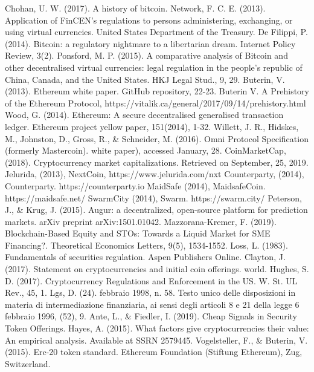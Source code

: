 \begin{thebibliography}{90}
 Chohan, U. W. (2017). A history of bitcoin.
 Network, F. C. E. (2013). Application of FinCEN’s regulations to persons administering, exchanging, or using virtual currencies. United States Department of the Treasury.
 De Filippi, P. (2014). Bitcoin: a regulatory nightmare to a libertarian dream. Internet Policy Review, 3(2).
 Ponsford, M. P. (2015). A comparative analysis of Bitcoin and other decentralised virtual currencies: legal regulation in the people's republic of China, Canada, and the United States. HKJ Legal Stud., 9, 29.
 Buterin, V. (2013). Ethereum white paper. GitHub repository, 22-23.
 Buterin V. A Prehistory of the Ethereum Protocol, https://vitalik.ca/general/2017/09/14/prehistory.html
 Wood, G. (2014). Ethereum: A secure decentralised generalised transaction ledger. Ethereum project yellow paper, 151(2014), 1-32.
 Willett, J. R., Hidskes, M., Johnston, D., Gross, R., \& Schneider, M. (2016). Omni Protocol Specification (formerly Mastercoin). white paper), accessed January, 28.
 CoinMarketCap, (2018). Cryptocurrency market capitalizations. Retrieved on September, 25, 2019.
 Jelurida, (2013), NextCoin, https://www.jelurida.com/nxt
 Counterparty, (2014), Counterparty. https://counterparty.io
  MaidSafe (2014), MaidsafeCoin. https://maidsafe.net/
 SwarmCity (2014), Swarm. https://swarm.city/
 Peterson, J., \& Krug, J. (2015). Augur: a decentralized, open-source platform for prediction markets. arXiv preprint arXiv:1501.01042.
 Mazzorana-Kremer, F. (2019). Blockchain-Based Equity and STOs: Towards a Liquid Market for SME Financing?. Theoretical Economics Letters, 9(5), 1534-1552.
  Loss, L. (1983). Fundamentals of securities regulation. Aspen Publishers Online.
 Clayton, J. (2017). Statement on cryptocurrencies and initial coin offerings. world.
 Hughes, S. D. (2017). Cryptocurrency Regulations and Enforcement in the US. W. St. UL Rev., 45, 1.
 Lgs, D. (24). febbraio 1998, n. 58. Testo unico delle disposizioni in materia di intermediazione finanziaria, ai sensi degli articoli 8 e 21 della legge 6 febbraio 1996, (52), 9.
 Ante, L., \& Fiedler, I. (2019). Cheap Signals in Security Token Offerings.
 Hayes, A. (2015). What factors give cryptocurrencies their value: An empirical analysis. Available at SSRN 2579445.
 Vogelsteller, F., & Buterin, V. (2015). Erc-20 token standard. Ethereum Foundation (Stiftung Ethereum), Zug, Switzerland.
\end{thebibliography}